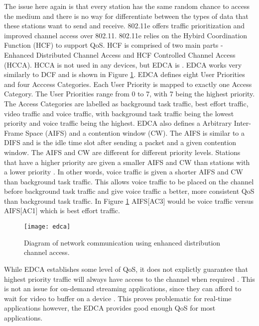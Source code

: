 \documentclass[12pt]{article}
\begin{document}
The issue here again is that every station has the same random chance to access the medium and there is no way for differentiate between the types of data that these stations want to send and receive.  802.11e offers traffic prioritization and improved channel access over 802.11.  802.11e relies on the Hybird Coordination Function (HCF) to support QoS.  HCF is comprised of two main parts - Enhanced Distributed Channel Access and  HCF Controlled
Channel Access (HCCA).  HCCA is not used in any devices, but EDCA is \cite{Thottan:2006:IEM:1234161.1234187}.  EDCA works very similarly to DCF and is shown in Figure \ref{fig:edca}.  EDCA defines eight User Priorities and four Acccess Categories.  Each User Priority is mapped to exactly one Access Category.  The User Priorities range from 0 to 7, with 7 being the highest priority.  The Access Categories are labelled as background task traffic, best effort traffic, video traffic and voice traffic, with background task traffic being the lowest priority and voice traffic being the highest.  EDCA also defines a Arbitrary Inter-Frame Space (AIFS) and a contention window (CW).  The AIFS is similar to a DIFS and is the idle time slot after sending a packet and a given contention window.  The AIFS and CW are different for different priority levels.  Stations that have a higher priority are given a smaller AIFS and CW than stations with a lower priority \cite{7434292}.  In other words, voice traffic is given a shorter AIFS and CW than background task traffic.  This allows voice traffic to be placed on the channel before background task traffic and give voice traffic a better, more consistent QoS than background task traffic.  In Figure \ref{fig:edca} AIFS[AC3] would be voice traffic versus AIFS[AC1] which is best effort traffic.

\begin{figure}[htb]
  \begin{center}
    \texttt{[image: edca]}
    \caption{Diagram of network communication using enhanced distribution channel access.}
    \label{fig:edca}
  \end{center}
\end{figure}

While EDCA establishes some level of QoS, it does not explictly guarantee that highest priority traffic will always have access to the channel when required \cite{Thottan:2006:IEM:1234161.1234187}.  This is not an issue for on-demand streaming applications, since they can afford to wait for video to buffer on a device \cite{ciscoqos}.  This proves problematic for real-time applications \cite{5336865} however, the EDCA provides good enough QoS for most applications.
\end{document}
